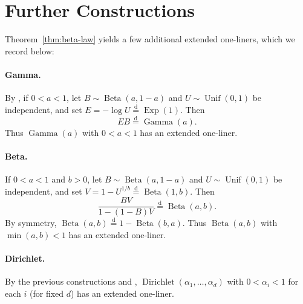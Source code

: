 \documentclass[11pt]{article}
\theoremstyle{plain}
\theoremstyle{remark}
\newcommand{\eqdist}{\mathrel{\overset{\mathrm{d}}{=}}}
\begin{document}
\section{Further Constructions}
\label{sec:consequences}
Theorem~\ref{thm:beta-law} yields a few additional extended one-liners, which we record below:

\paragraph{Gamma.}
By \cite[Section IX.3.5]{devroye1986nonuniform}, if $0<a<1$, let
$B \sim \operatorname{Beta}(a,1-a)$ and $U\sim\operatorname{Unif}(0,1)$ be
independent, and set $E=-\log U \eqdist \operatorname{Exp}(1)$. Then
\[
  EB \eqdist \operatorname{Gamma}(a).
\]
Thus $\operatorname{Gamma}(a)$ with $0<a<1$ has an extended one-liner.

\paragraph{Beta.}
If $0<a<1$ and $b>0$, let $B \sim \operatorname{Beta}(a,1-a)$ and
$U\sim\operatorname{Unif}(0,1)$ be independent, and set
$V = 1-U^{1/b} \eqdist \operatorname{Beta}(1,b)$. Then
\[
  \frac{BV}{1-(1-B)V} \eqdist \operatorname{Beta}(a,b).
\]
By symmetry, $\operatorname{Beta}(a,b) \eqdist 1-\operatorname{Beta}(b,a)$. Thus $\operatorname{Beta}(a,b)$ with $\min(a,b)<1$ has an extended one-liner.

\paragraph{Dirichlet.}
By the previous constructions and \cite[Theorems XI.4.1, XI.4.2]{devroye1986nonuniform},
$\operatorname{Dirichlet}(\alpha_1,\dots,\alpha_d)$ with $0<\alpha_i<1$ for each $i$ (for fixed $d$) has an extended one-liner.
\end{document}

